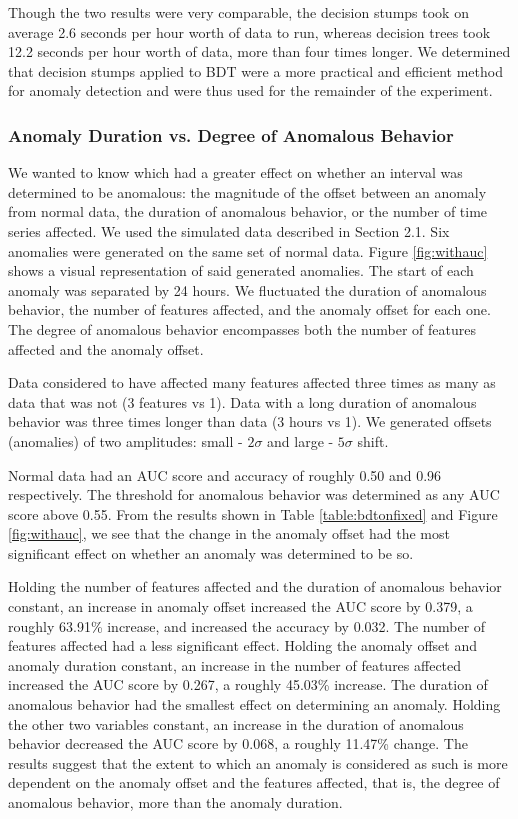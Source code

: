 \documentclass[5p]{elsarticle}
\begin{document}
Though the two results were very comparable, the decision stumps took on average 2.6 seconds per hour worth of data to run, whereas decision trees took 12.2 seconds per hour worth of data, more than four times longer. We determined that decision stumps applied to BDT were a more practical and efficient method for anomaly detection and were thus used for the remainder of the experiment.

\subsubsection{Anomaly Duration vs. Degree of Anomalous Behavior}

We wanted to know which had a greater effect on whether an interval was determined to be anomalous: the magnitude of the offset between an anomaly from normal data, the duration of anomalous behavior, or the number of time series affected. We used the simulated data described in Section 2.1. Six anomalies were generated on the same set of normal data. Figure \ref{fig:withauc} shows a visual representation of said generated anomalies. The start of each anomaly was separated by 24 hours. We fluctuated the duration of anomalous behavior, the number of features affected, and the anomaly offset for each one. The degree of anomalous behavior encompasses both the number of features affected and the anomaly offset.

Data considered to have affected many features affected three times as many as data that was not (3 features vs 1). Data with a long duration of anomalous behavior was three times longer than data (3 hours vs 1). We generated offsets (anomalies) of two amplitudes: small - $2\sigma$ and large - $5\sigma$ shift. 

Normal data had an AUC score and accuracy of roughly 0.50 and 0.96 respectively. The threshold for anomalous behavior was determined as any AUC score above 0.55. From the results shown in Table \ref{table:bdtonfixed} and Figure \ref{fig:withauc}, we see that the change in the anomaly offset had the most significant effect on whether an anomaly was determined to be so.

Holding the number of features affected and the duration of anomalous behavior constant, an increase in anomaly offset increased the AUC score by 0.379, a roughly 63.91\% increase, and increased the accuracy by 0.032. The number of features affected had a less significant effect. Holding the anomaly offset and anomaly duration constant, an increase in the number of features affected increased the AUC score by 0.267, a roughly 45.03\% increase. The duration of anomalous behavior had the smallest effect on determining an anomaly. Holding the other two variables constant, an increase in the duration of anomalous behavior decreased the AUC score by 0.068, a roughly 11.47\% change. The results suggest that the extent to which an anomaly is considered as such is more dependent on the anomaly offset and the features affected, that is, the degree of anomalous behavior, more than the anomaly duration.
\end{document}
